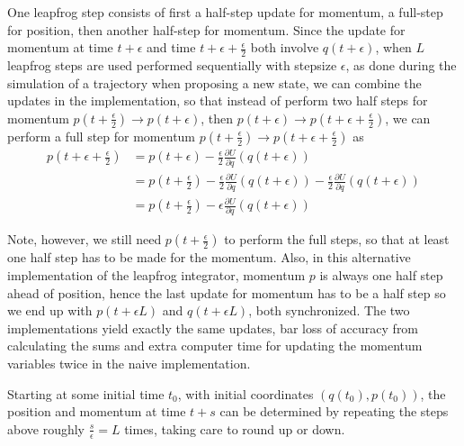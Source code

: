 \documentclass{book}
\begin{document}
\begin{enumerate}
One leapfrog step consists of first a half-step update for momentum, a full-step
for position, then another half-step for momentum. Since the update for momentum
at time $t+\epsilon$ and time $t+\epsilon + \frac{\epsilon}{2}$ both involve
$q(t+\epsilon)$, when $L$ leapfrog steps are used performed sequentially with
 stepsize $\epsilon$, as done during the simulation of a trajectory when proposing a new
 state,  we can combine the updates in the implementation, so that instead of perform two half steps for momentum $p(t+\frac{\epsilon}{2}) \rightarrow p(t+\epsilon)$, then $ p(t+\epsilon) \rightarrow p(t+\epsilon + \frac{\epsilon}{2})$, we can perform a full step for momentum $p(t+\frac{\epsilon}{2}) \rightarrow p(t+ \epsilon + \frac{\epsilon}{2}) $ as 
\begin{align}
p(t+\epsilon + \frac{\epsilon}{2})  
&= p(t+\epsilon) - \frac{\epsilon}{2} \frac{\partial U}{\partial q }(q(t+\epsilon)) \\
&= p(t+\frac{\epsilon}{2}) - \frac{\epsilon}{2} \frac{\partial U}{\partial q }(q(t+\epsilon)) - \frac{\epsilon}{2} \frac{\partial U}{\partial q }(q(t+\epsilon)) \\
&= p(t+\frac{\epsilon}{2}) - \epsilon \frac{\partial U}{\partial q }(q(t+\epsilon))
\end{align}

Note, however, we still need $p(t+\frac{\epsilon}{2})$ to perform the full
steps, so that at least one half step has to be made for the momentum. Also, in
this alternative implementation of the leapfrog integrator, momentum $p$ is
always one half step ahead of position, hence the last update for momentum has
to be a half step so we end up with $p(t+\epsilon L)$ and $q(t+\epsilon L )$,
both synchronized. The two implementations yield exactly the same updates, bar
loss of accuracy from calculating the sums and extra computer time for updating
the momentum variables twice in the naive implementation. 

Starting at some initial time $t_0$, with initial coordinates $(q(t_0),p(t_0))$, the position and momentum at time $t+s$ can be determined by repeating the steps above roughly $\frac{s}{\epsilon} = L$ times, taking care to round up or down. 


\end{enumerate}
\end{document}
